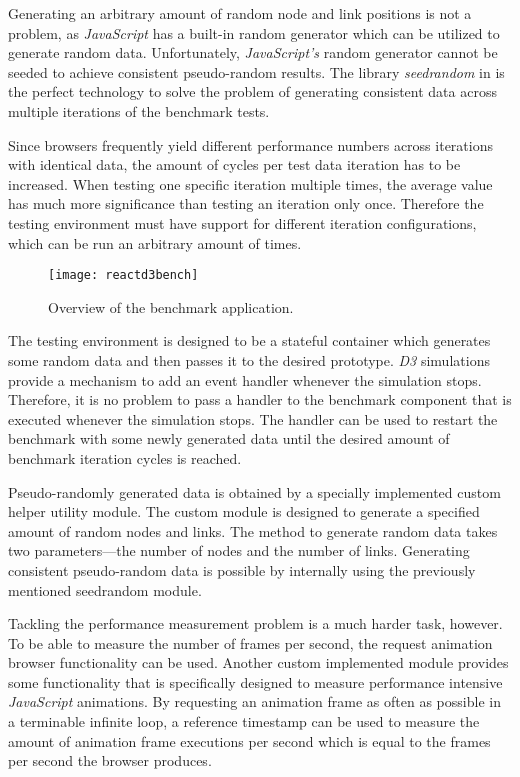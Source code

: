 Generating an arbitrary amount of random node and link positions is not a problem, as \emph{JavaScript} has a built-in random generator which can be utilized to generate random data. Unfortunately, \emph{JavaScript's} random generator cannot be seeded to achieve consistent pseudo-random results. The library \emph{seedrandom} in \cite{SeedRandom} is the perfect technology to solve the problem of generating consistent data across multiple iterations of the benchmark tests.

Since browsers frequently yield different performance numbers across iterations with identical data, the amount of cycles per test data iteration has to be increased. When testing one specific iteration multiple times, the average value has much more significance than testing an iteration only once. Therefore the testing environment must have support for different iteration configurations, which can be run an arbitrary amount of times.

\begin{figure}
  \centering
  \texttt{[image: reactd3bench]}
  \caption{Overview of the benchmark application.}
  \label{fig:reactD3bench1}
\end{figure}

The testing environment is designed to be a stateful container which generates some random data and then passes it to the desired prototype. \emph{D3} simulations provide a mechanism to add an event handler whenever the simulation stops. Therefore, it is no problem to pass a handler to the benchmark component that is executed whenever the simulation stops. The handler can be used to restart the benchmark with some newly generated data until the desired amount of benchmark iteration cycles is reached.

Pseudo-randomly generated data is obtained by a specially implemented custom helper utility module. The custom module is designed to generate a specified amount of random nodes and links. The method to generate random data takes two parameters---the number of nodes and the number of links. Generating consistent pseudo-random data is possible by internally using the previously mentioned seedrandom module.

Tackling the performance measurement problem is a much harder task, however. To be able to measure the number of frames per second, the request animation browser functionality can be used. Another custom implemented module provides some functionality that is specifically designed to measure performance intensive \emph{JavaScript} animations. By requesting an animation frame as often as possible in a terminable infinite loop, a reference timestamp can be used to measure the amount of animation frame executions per second which is equal to the frames per second the browser produces.

